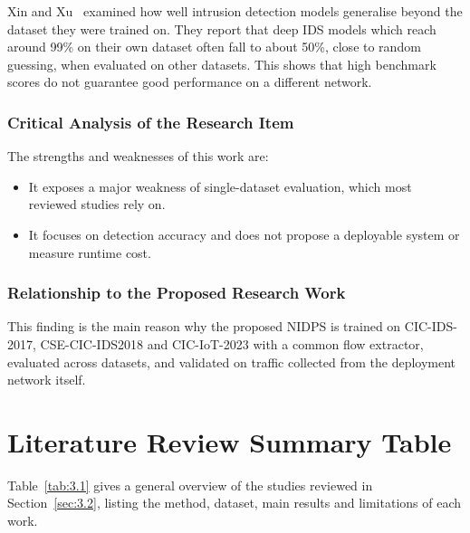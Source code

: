 \noindent Xin and Xu~\cite{lr:xin2025} examined how well intrusion detection models generalise beyond the dataset they were trained on. They report that deep IDS models which reach around 99\% on their own dataset often fall to about 50\%, close to random guessing, when evaluated on other datasets. This shows that high benchmark scores do not guarantee good performance on a different network.

\subsubsection{Critical Analysis of the Research Item}\label{sec:3.2.15.2}

\noindent The strengths and weaknesses of this work are:

\begin{itemize}
\item It exposes a major weakness of single-dataset evaluation, which most reviewed studies rely on.
\item It focuses on detection accuracy and does not propose a deployable system or measure runtime cost.
\end{itemize}

\subsubsection{Relationship to the Proposed Research Work}\label{sec:3.2.15.3}

\noindent This finding is the main reason why the proposed NIDPS is trained on CIC-IDS-2017, CSE-CIC-IDS2018 and CIC-IoT-2023 with a common flow extractor, evaluated across datasets, and validated on traffic collected from the deployment network itself.

\section{Literature Review Summary Table}\label{sec:3.3}

\noindent Table~\ref{tab:3.1} gives a general overview of the studies reviewed in Section~\ref{sec:3.2}, listing the method, dataset, main results and limitations of each work.

